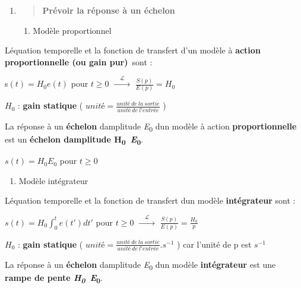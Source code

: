 \begin{enumerate}
\def\labelenumi{\arabic{enumi}.}
\item
  \begin{quote}
  \protect\hypertarget{mod-_Toc99121097}{}{}\textbf{Prévoir la réponse à un échelon}
  \end{quote}

  \begin{enumerate}
  \def\labelenumii{\arabic{enumii}.}
  \item
    \protect\hypertarget{mod-_Toc99121098}{}{}Modèle proportionnel
  \end{enumerate}
\end{enumerate}

L\textquotesingle équation temporelle et la fonction de transfert d'un modèle à \textbf{action proportionnelle (ou gain pur)}~sont :

s\((t) = H_{0}e(t)\) pour \(t \geq 0\) \(\overset{\quad\mathcal{L}\quad}{\rightarrow}\) \(\frac{S(p)}{E(p)} = H_{0}\)

\(H_{0}\) : \textbf{gain statique} ( \(unité = \frac{unité\ de\ la\ sortie}{unité\ de\ l'entrée}\) )

La réponse à un \textbf{échelon} d\textquotesingle amplitude \emph{E}\textsubscript{0} d\textquotesingle un modèle à action \textbf{proportionnelle} est un \textbf{échelon d\textquotesingle amplitude H\textsubscript{0}\emph{~E}\textsubscript{0}}.

\(s(t) = H_{0}E_{0}\) pour \(t \geq 0\)

\begin{enumerate}
\def\labelenumi{\arabic{enumi}.}
\setcounter{enumi}{1}
\item
  \protect\hypertarget{mod-_Toc272938046}{}{}Modèle intégrateur
\end{enumerate}

L\textquotesingle équation temporelle et la fonction de transfert d\textquotesingle un modèle \textbf{intégrateur} sont :

\(s(t) = H_{0}\int_{0}^{t}{e(t')}dt'\) pour \(t \geq 0\) \(\overset{\quad\mathcal{L}\quad}{\rightarrow}\) \(\frac{S(p)}{E(p)} = \frac{H_{0}}{p}\)

\(H_{0}\) : \textbf{gain statique} ( \(unité = \frac{unité\ de\ la\ sortie}{unité\ de\ l'entrée}.s^{- 1}\) ) car l'unité de p est \(s^{- 1}\)

La réponse à un \textbf{échelon} d\textquotesingle amplitude \emph{E}\textsubscript{0} d\textquotesingle un modèle \textbf{intégrateur} est une \textbf{rampe de pente \emph{H\textsubscript{0}~E}\textsubscript{0}}.

